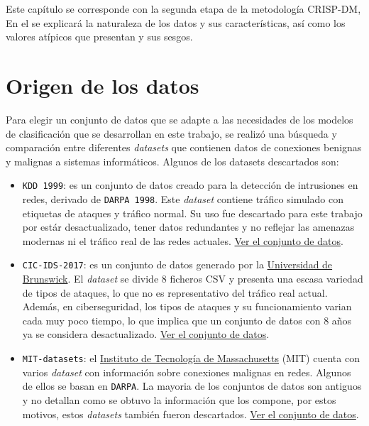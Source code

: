 Este capítulo se corresponde con la segunda etapa de la metodología CRISP-DM, En el se explicará la naturaleza de los datos y sus características, así como los valores atípicos que presentan y sus sesgos.

\section{Origen de los datos}  \label{sec.origen-datos}
Para elegir un conjunto de datos que se adapte a las necesidades de los modelos de clasificación que se desarrollan en este trabajo, se realizó una búsqueda y comparación entre diferentes \textit{datasets} que contienen datos de conexiones benignas y malignas a sistemas informáticos. Algunos de los datasets descartados son:

\begin{itemize}
	\item \texttt{KDD 1999}: es un conjunto de datos creado para la detección de intrusiones en redes, derivado de \texttt{DARPA 1998}. Este \textit{dataset} contiene tráfico simulado con etiquetas de ataques y tráfico normal. Su uso fue descartado para este trabajo por estár desactualizado, tener datos redundantes y no reflejar las amenazas modernas ni el tráfico real de las redes actuales. \href{https://www.kaggle.com/datasets/sampadab17/network-intrusion-detection/data?select=Test_data.csv}{Ver el conjunto de datos}.
	\item \texttt{CIC-IDS-2017}: es un conjunto de datos generado por la \href{https://www.unb.ca/cic/datasets/ids-2017.html}{Universidad de Brunswick}. El \textit{dataset} se divide 8 ficheros CSV y presenta una escasa variedad de tipos de ataques, lo que no es representativo del tráfico real actual. Además, en ciberseguridad, los tipos de ataques y su funcionamiento varian cada muy poco tiempo, lo que implica que un conjunto de datos con 8 años ya se considera desactualizado. \href{https://www.kaggle.com/datasets/chethuhn/network-intrusion-dataset}{Ver el conjunto de datos}.
	\item \texttt{MIT-datasets}: el \href{https://www.ll.mit.edu/r-d/datasets?author=All&rdarea=All&rdgroup=All&keywords=cyber&tag=All&items_per_page=100}{Instituto de Tecnología de Massachusetts} (MIT) cuenta con varios \textit{dataset} con información sobre conexiones malignas en redes. Algunos de ellos se basan en \texttt{DARPA}. La mayoria de los conjuntos de datos son antiguos y no detallan como se obtuvo la información que los compone, por estos motivos, estos \textit{datasets} también fueron descartados. \href{https://archive.ll.mit.edu/ideval/index.html}{Ver el conjunto de datos}.
\end{itemize}

